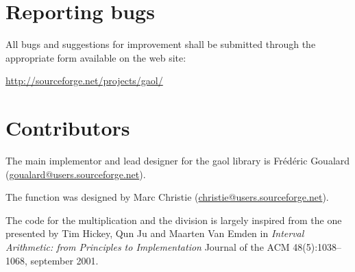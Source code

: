 \documentclass{manual}
\begin{document}
\chapter{Reporting bugs}

All bugs and suggestions for improvement shall be submitted through the appropriate form
available on the web site:

\begin{center}
  \url{http://sourceforge.net/projects/gaol/}
\end{center}

\chapter{Contributors}

The main implementor and lead designer for the gaol library is Fr\'ed\'eric Goualard
(\href{mailto:goualard@users.sourceforge.net}{goualard@users.sourceforge.net}).

The  function
was designed by Marc Christie
(\href{mailto:christie@users.sourceforge.net}{christie@users.sourceforge.net}).

The code for the multiplication and the division is largely inspired
from the one presented by Tim Hickey, Qun Ju and Maarten Van Emden in
\emph{Interval Arithmetic: from Principles to Implementation} Journal
of the ACM 48(5):1038--1068, september 2001.


\label{chap:copying}






\printindex[idx]
\end{document}
